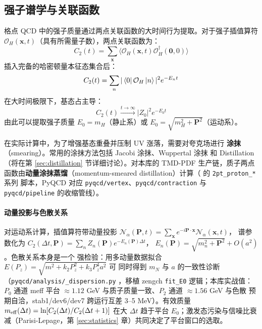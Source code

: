 \documentclass[11pt,a4paper]{ctexart}
\newcommand{\code}[1]{\texttt{#1}}
\newcommand{\pathref}[1]{\path{#1}}
\begin{document}
\subsection{强子谱学与关联函数}

格点 QCD 中的强子质量通过两点关联函数的大时间行为提取。对于强子插值算符
$\mathcal{O}_H(\mathbf{x}, t)$（具有所需量子数），两点关联函数为：
\begin{equation}
C_2(t) = \sum_{\mathbf{x}}
\langle \mathcal{O}_H(\mathbf{x}, t) \mathcal{O}_H^\dagger(\mathbf{0}, 0)
\rangle
\end{equation}
插入完备的哈密顿量本征态集合后：
\begin{equation}
C_2(t) = \sum_n |\bra{0} \mathcal{O}_H \ket{n}|^2 e^{-E_n t}
\end{equation}
在大时间极限下，基态占主导：
\begin{equation}
C_2(t) \xrightarrow{t \to \infty} |Z_0|^2 e^{-E_0 t}
\end{equation}
由此可以提取强子质量 $E_0 = m_H$（静止系）或
$E_0 = \sqrt{m_H^2 + \mathbf{P}^2}$（运动系）。

在实际计算中，为了增强基态重叠并压制 UV 涨落，需要对夸克场进行
\textbf{涂抹}（smearing）。常用的涂抹方法包括 Jacobi 涂抹、Wuppertal 涂抹
和 Distillation（将在第 \ref{sec:distillation} 节详细讨论）。对本库的
TMD-PDF 生产链，质子两点函数由\textbf{动量涂抹蒸馏}（momentum-smeared
distillation）计算（\pathref{refer/donghx/} 的 \code{2pt\_proton\_*} 系列
脚本，PyQCD 对应 \code{pyqcd/vertex}、\code{pyqcd/contraction} 与
\code{pyqcd/pipeline} 的收缩管线）。

\paragraph{动量投影与色散关系}对运动系计算，插值算符带动量投影
$\mathcal N_\alpha(\mathbf P,t)=\sum_{\mathbf x}
e^{-i\mathbf P\cdot\mathbf x}\mathcal N_\alpha(\mathbf x,t)$，
谱参数化为
$C_2(\Delta t,\mathbf P)=\sum_n Z_n(\mathbf P)e^{-E_n(\mathbf P)\Delta t}$，
$E_n(\mathbf P)=\sqrt{m_n^2+\mathbf P^2}+O(a^2)$。色散关系本身是一个
强检验：用多动量数据拟合 $E(P_z)=\sqrt{m^2+k_2P_z^2+k_3P_z^4a^2}$ 可
同时得到 $m_N$ 与 $a$ 的一致性诊断（\code{pyqcd/analysis/\_dispersion.py}
，移植 zengch \code{fit\_E0} 逻辑；本库实战值：$P_0$ 通道 meff 平台
$\approx1.12$ GeV 与质子质量一致、$P_2$ 通道 $\approx1.56$ GeV 与色散
预期自洽，stab1/dev6/dev7 跨运行互差 3--5 MeV）。有效质量
$m_{\rm eff}(\Delta t)=\ln[C_2(\Delta t)/C_2(\Delta t+1)]$ 在大
$\Delta t$ 趋于平台 $E_0$；激发态污染与信噪比衰减（Parisi-Lepage，第
\ref{sec:statistics} 章）共同决定了平台窗口的选取。
\end{document}
